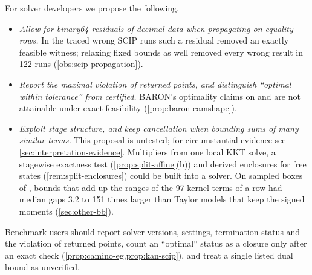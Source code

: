 For solver developers we propose the following.
\begin{itemize}\setlength{\itemsep}{0pt}\setlength{\parsep}{0pt}
\item \emph{Allow for binary64 residuals of decimal data when propagating on equality rows.}
In the traced wrong SCIP runs such a residual removed an exactly feasible witness; relaxing fixed bounds as well removed every wrong result in 122 runs (\cref{obs:scip-propagation}).
\item \emph{Report the maximal violation of returned points, and distinguish ``optimal within tolerance'' from certified.}
BARON's optimality claims on  and  are not attainable under exact feasibility (\cref{prop:baron-camshape}).
\item \emph{Exploit stage structure, and keep cancellation when bounding sums of many similar terms.}
This proposal is untested; for circumstantial evidence see \cref{sec:interpretation-evidence}.
Multipliers from one local KKT solve, a stagewise exactness test (\cref{prop:split-affine}(b)) and derived enclosures for free states (\cref{rem:split-enclosures}) could be built into a solver.
On sampled boxes of , bounds that add up the ranges of the 97 kernel terms of a row had median gaps 3.2 to 151 times larger than Taylor models that keep the signed moments (\cref{sec:other-bb}).
\end{itemize}
Benchmark users should report solver versions, settings, termination status and the violation of returned points, count an ``optimal'' status as a closure only after an exact check (\cref{prop:camino-eg,prop:kan-scip}), and treat a single listed dual bound as unverified.
